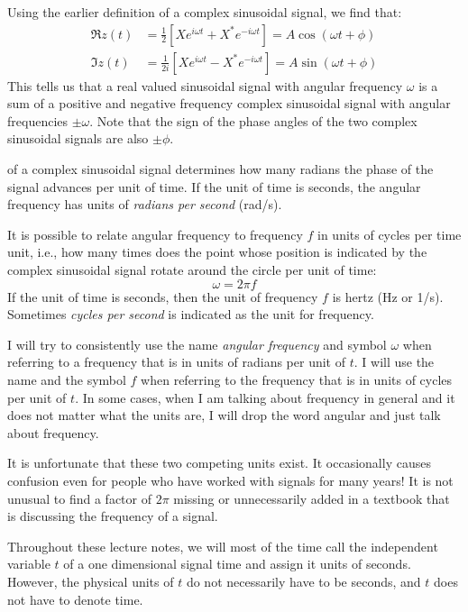 Using the earlier definition of a complex sinusoidal signal, we find that:
\begin{align}
\Re{z(t)} &= \frac{1}{2}\left[X e^{i\omega t} + X^* e^{-i\omega t}\right] = A\cos(\omega t + \phi) \label{eq:resignal} \\
\Im{z(t)} &= \frac{1}{2i}\left[X e^{i\omega t} - X^* e^{-i\omega t}\right] = A\sin(\omega t + \phi) \label{eq:imsignal}
\end{align}
This tells us that a real valued sinusoidal signal with angular frequency $\omega$ is a sum of a positive and negative frequency complex sinusoidal signal with angular frequencies $\pm\omega$. Note that the sign of the phase angles of the two complex sinusoidal signals are also $\pm\phi$.

 of a complex sinusoidal signal determines how many radians the phase of the signal advances per unit of time. If the unit of time is seconds, the angular frequency has units of \emph{radians per second} (rad/s).

It is possible to relate angular frequency to frequency $f$ in units of cycles per time unit, i.e., how many times does the point whose position is indicated by the complex sinusoidal signal rotate around the circle per unit of time:
\begin{equation}
\boxed{\omega = 2\pi f}
\end{equation}
If the unit of time is seconds, then the unit of frequency $f$ is hertz (Hz or 1/s). Sometimes \emph{cycles per second} is indicated as the unit for frequency. 

I will try to consistently use the name \emph{angular frequency} and symbol $\omega$ when referring to a frequency that is in units of radians per unit of $t$. I will use the name \emph{} and the symbol $f$ when referring to the frequency that is in units of cycles
per unit of $t$. In some cases, when I am talking about frequency in general and it does not matter what the units are, I will drop the word angular and just talk about frequency.

It is unfortunate that these two competing units exist. It
occasionally causes confusion even for people who have worked with signals for many years!  It is not unusual to find a factor of $2\pi$ missing or unnecessarily added in a textbook that is discussing the frequency of a signal.

Throughout these lecture notes, we will most of the time call the independent variable $t$ of a one dimensional signal time and assign it units of seconds. However, the physical units of $t$ do not necessarily have to be seconds, and $t$ does not have to denote time.

